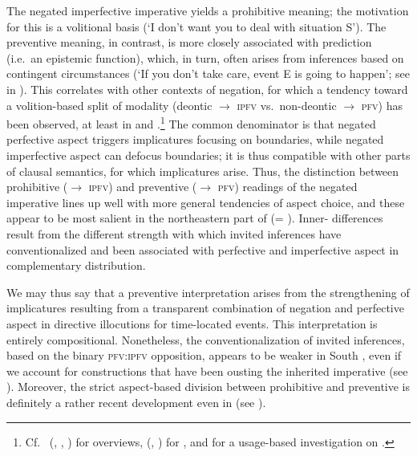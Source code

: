 \documentclass[output=paper,colorlinks,citecolor=brown]{langscibook}
\begin{document}
\noindent The negated imperfective imperative yields a prohibitive meaning; the motivation for this is a volitional basis (`I don't want you to deal with situation S'). The preventive meaning, in contrast, is more closely associated with prediction (i.e.\ an epistemic function), which, in turn, often arises from inferences based on contingent circumstances (`If you don't take care, event E is going to happen'; see  in ). This correlates with other contexts of negation, for which a tendency toward a volition-based split of modality (deontic ${\rightarrow}$ \textsc{ipfv} vs.\ non-deontic ${\rightarrow}$ \textsc{pfv}) has been observed, at least in  and .\footnote{Cf.\ \citeauthor{Wiemer2001} (\citeyear{Wiemer2001}, \citeyear[403--405]{Wiemer2008}, \citeyear[281--285]{Wiemer2017}) for overviews, \citeauthor{Padučeva2008} (\citeyear{Padučeva2008}, \citeyear[211--218]{Padučeva2013}) for , and \citet{Divjak2009} for a usage-based investigation on .} The common denominator is that negated perfective aspect triggers implicatures focusing on boundaries, while negated imperfective aspect can defocus boundaries; it is thus compatible with other parts of clausal semantics, for which implicatures arise. Thus, the distinction between prohibitive (${\rightarrow}$ \textsc{ipfv}) and preventive (${\rightarrow}$ \textsc{pfv}) readings of the negated imperative lines up well with more general tendencies of aspect choice, and these appear to be most salient in the northeastern part of  (= ). Inner- differences result from the different strength with which invited inferences have conventionalized and been associated with perfective and imperfective aspect in complementary distribution.


We may thus say that a preventive interpretation arises from the strengthening of implicatures resulting from a transparent combination of negation and perfective aspect in directive illocutions for time-located events. This interpretation is entirely compositional. Nonetheless, the conventionalization of invited inferences, based on the binary \textsc{pfv:ipfv} opposition, appears to be weaker in South , even if we account for constructions that have been ousting the inherited imperative (see ). Moreover, the strict aspect-based division between prohibitive and preventive is definitely a rather recent development even in  (see ). 
\end{document}
